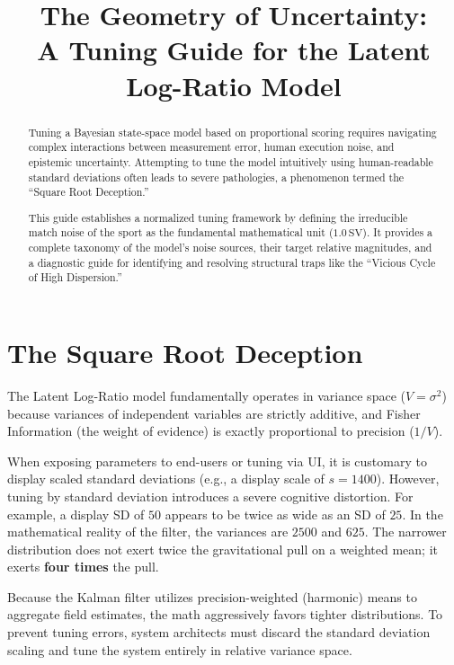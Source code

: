\documentclass[12pt]{article}
\title{The Geometry of Uncertainty:\\A Tuning Guide for the Latent Log-Ratio Model}
\author{}
\date{}
\begin{document}
	
	\maketitle
	
	\begin{abstract}
		Tuning a Bayesian state-space model based on proportional scoring requires navigating complex interactions between measurement error, human execution noise, and epistemic uncertainty. Attempting to tune the model intuitively using human-readable standard deviations often leads to severe pathologies, a phenomenon termed the ``Square Root Deception.'' 
		
		This guide establishes a normalized tuning framework by defining the irreducible match noise of the sport as the fundamental mathematical unit ($1.0\,\text{SV}$). It provides a complete taxonomy of the model's noise sources, their target relative magnitudes, and a diagnostic guide for identifying and resolving structural traps like the ``Vicious Cycle of High Dispersion.''
	\end{abstract}
	
	\section{The Square Root Deception}
	The Latent Log-Ratio model fundamentally operates in variance space ($V = \sigma^2$) because variances of independent variables are strictly additive, and Fisher Information (the weight of evidence) is exactly proportional to precision ($1/V$).
	
	When exposing parameters to end-users or tuning via UI, it is customary to display scaled standard deviations (e.g., a display scale of $s=1400$). However, tuning by standard deviation introduces a severe cognitive distortion. For example, a display SD of $50$ appears to be twice as wide as an SD of $25$. In the mathematical reality of the filter, the variances are $2500$ and $625$. The narrower distribution does not exert twice the gravitational pull on a weighted mean; it exerts \textbf{four times} the pull.
	
	Because the Kalman filter utilizes precision-weighted (harmonic) means to aggregate field estimates, the math aggressively favors tighter distributions. To prevent tuning errors, system architects must discard the standard deviation scaling and tune the system entirely in relative variance space.
	
\end{document}
